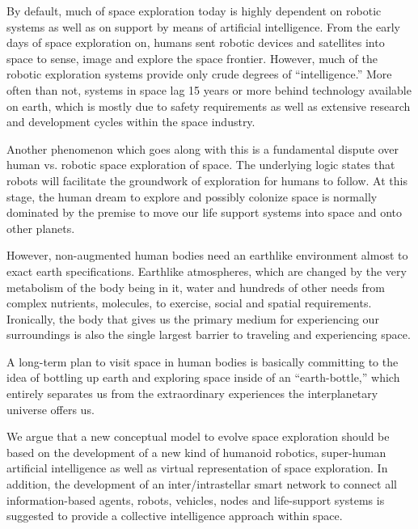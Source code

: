 \documentclass[letter,11pt]{article}
\begin{document}
By default, much of space exploration today is highly dependent on robotic
systems as well as on support by means of artificial intelligence. From the
early days of space exploration on, humans sent robotic devices and satellites
into space to sense, image and explore the space frontier. However, much of the
robotic exploration systems provide only crude degrees of ``intelligence.''
More often than not, systems in space lag 15 years or more behind technology
available on earth, which is mostly due to safety requirements as well as
extensive research and development cycles within the space industry.  

Another phenomenon which goes along with this is a fundamental dispute over
human vs. robotic space exploration of space. The underlying logic states that
robots will facilitate the groundwork of exploration for humans to follow. At
this stage, the human dream to explore and possibly colonize space is normally
dominated by the premise to move our life support systems into space and onto
other planets.

However, non-augmented human bodies need an earthlike environment almost to
exact earth specifications. Earthlike atmospheres, which are changed by the
very metabolism of the body being in it, water and hundreds of other needs from
complex nutrients, molecules, to exercise, social and spatial requirements.
Ironically, the body that gives us the primary medium for experiencing our
surroundings is also the single largest barrier to traveling and experiencing
space. 

A long-term plan to visit space in human bodies is basically committing to the
idea of bottling up earth and exploring space inside of an ``earth-bottle,''
which entirely separates us from the extraordinary experiences the
interplanetary universe offers us. 

We argue that a new conceptual model to evolve space exploration should be
based on the development of a new kind of humanoid robotics, super-human
artificial intelligence as well as virtual representation of space exploration.
In addition, the development of an inter/intrastellar smart network to connect
all information-based agents, robots, vehicles, nodes and life-support systems
is suggested to provide a collective intelligence approach within space.
\end{document}
